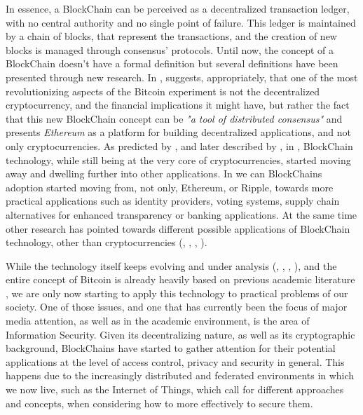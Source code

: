 In essence, a BlockChain can be perceived as a decentralized transaction ledger, with no central authority and no single point of failure. This ledger is maintained by a chain of blocks, that represent the transactions, and the creation of new blocks is managed through consensus' protocols. Until now, the concept of a BlockChain doesn't have a formal definition but several definitions have been presented through new research. In \cite{buterin_next-generation_2013}, \citeauthor{buterin_next-generation_2013} suggests, appropriately, that one of the most revolutionizing aspects of the Bitcoin experiment is not the decentralized cryptocurrency, and the financial implications it might have, but rather the fact that this new BlockChain concept can be \textit{"a tool of distributed consensus"} and presents \textit{Ethereum} as a platform for building decentralized applications, and not only cryptocurrencies. As predicted by \citeauthor{buterin_next-generation_2013}, and later described by \citeauthor{pilkington_blockchain_2016}, in \cite{pilkington_blockchain_2016}, BlockChain technology, while still being at the very core of cryptocurrencies, started moving away and dwelling further into other applications. In \cite{pilkington_blockchain_2016} we can BlockChains adoption started moving from, not only, Ethereum, or Ripple, towards more practical applications such as identity providers, voting systems, supply chain alternatives for enhanced transparency or banking applications. At the same time other research has pointed towards different possible applications of BlockChain technology, other than cryptocurrencies (\cite{crosby_blockchain_2016}, \cite{underwood_blockchain_2016}, \cite{yermack_corporate_2017}, \cite{xu_blockchain_2016}).

While the technology itself keeps evolving and under analysis (\cite{eyal_bitcoin-ng:_2016}, \cite{wang_research_2018}, \cite{gervais_security_2016}, \cite{lin_survey_2017}), and the entire concept of Bitcoin is already heavily based on previous academic literature \cite{narayanan_bitcoins_2017}, we are only now starting to apply this technology to practical problems of our society. One of those issues, and one that has currently been the focus of major media attention, as well as in the academic environment, is the area of Information Security. Given its decentralizing nature, as well as its cryptographic background, BlockChains have started to gather attention for their potential applications at the level of access control, privacy and security in general. This happens due to the increasingly distributed and federated environments in which we now live, such as the Internet of Things, which call for different approaches and concepts, when considering how to more effectively to secure them.

